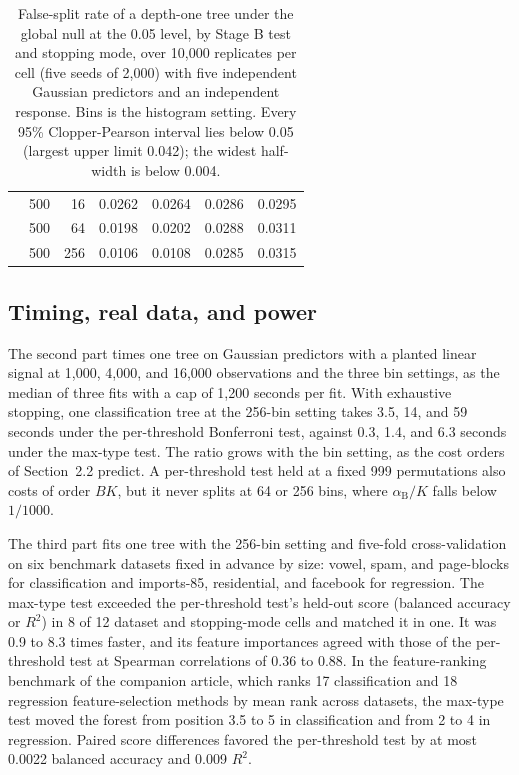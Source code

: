 \documentclass[11pt]{article}
\begin{document}
\begin{table}[t!]
\begin{tabular}{lrrrrrr}
 & 500 & 16 & 0.0262 & 0.0264 & 0.0286 & 0.0295 \\
 & 500 & 64 & 0.0198 & 0.0202 & 0.0288 & 0.0311 \\
 & 500 & 256 & 0.0106 & 0.0108 & 0.0285 & 0.0315 \\
\bottomrule
\end{tabular}
\caption{False-split rate of a depth-one tree under the global null at the
0.05 level, by Stage B test and stopping mode, over 10,000 replicates per
cell (five seeds of 2,000) with five independent Gaussian predictors and an
independent response. Bins is the histogram setting. Every 95\%
Clopper-Pearson interval lies below 0.05 (largest upper limit 0.042); the
widest half-width is below 0.004.}
\label{tab:threshold-calibration}
\end{table}

\subsection{Timing, real data, and power}

The second part times one tree on Gaussian predictors with a planted linear
signal at 1,000, 4,000, and 16,000 observations and the three bin settings,
as the median of three fits with a cap of 1,200 seconds per fit. With
exhaustive stopping, one classification tree at the 256-bin setting takes
3.5, 14, and 59 seconds under the per-threshold Bonferroni test, against 0.3,
1.4, and 6.3 seconds under the max-type test. The ratio grows with the bin
setting, as the cost orders of Section~2.2 predict. A per-threshold test held
at a fixed 999 permutations also costs of order $BK$, but it never splits at
64 or 256 bins, where $\alpha_{\mathrm{B}}/K$ falls below $1/1000$.

The third part fits one tree with the 256-bin setting and five-fold
cross-validation on six benchmark datasets fixed in advance by size: vowel,
spam, and page-blocks for classification and imports-85, residential, and
facebook for regression. The max-type test exceeded the per-threshold test's
held-out score (balanced accuracy or $R^2$) in 8 of 12 dataset and
stopping-mode cells and matched it in one. It was 0.9 to 8.3 times faster,
and its feature importances agreed with those of the per-threshold test at
Spearman correlations of 0.36 to 0.88. In the feature-ranking benchmark of
the companion article, which ranks 17 classification and 18 regression
feature-selection methods by mean rank across datasets, the max-type test
moved the forest from position 3.5 to 5 in classification and from 2 to 4 in
regression. Paired score differences favored the per-threshold test by at
most 0.0022 balanced accuracy and 0.009 $R^2$.
\end{document}
